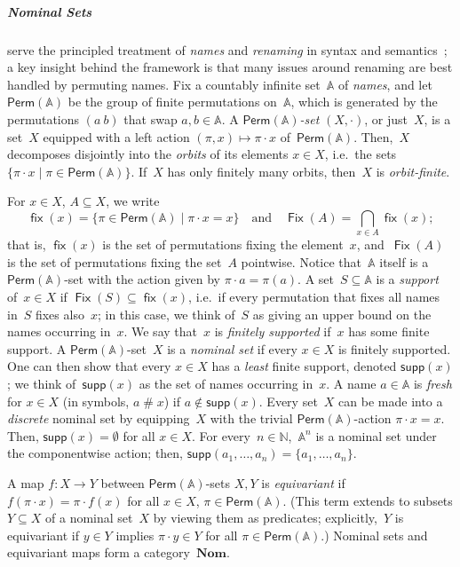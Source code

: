 \documentclass[11pt,a4paper]{amsart}
\newcommand{\Perm}{\mathsf{Perm}(\Names)}
\newcommand{\Names}{\mathbb{A}}
\newcommand{\fresh}{\mathbin{\#}}
\newcommand{\supp}{\mathsf{supp}}
\newcommand{\fix}{\mathop{\mathsf{fix}}}
\newcommand{\Fix}{\mathop{\mathsf{Fix}}}
\theoremstyle{plain}
\numberwithin{equation}{section}
\newcommand{\Nat}{{\mathbb{N}}}
\newcommand{\+}[1]{\mathcal{#1}\xspace}
\newcommand{\Nom}{\mathbf{Nom}}
\theoremstyle{definition}
\begin{document}
\subparagraph*{Nominal Sets} serve the principled treatment of
\emph{names} and \emph{renaming} in syntax and
semantics~\cite{Pitts13}; a key insight behind the framework is that many
issues around renaming are best handled by permuting names. Fix a
countably infinite set~$\Names$ of \emph{names}, and let~$\Perm$ be
the group of finite permutations on~$\Names$, which is generated by the permutations $(a\ b)$ that
swap $a,b\in\Names$. A \emph{$\Perm$-set} $(X,{\cdot})$, or just~$X$,
is a set~$X$ equipped with a left action $(\pi,x)\mapsto \pi\cdot x$
of~$\Perm$. Then,~$X$ decomposes disjointly into the \emph{orbits} of
its elements $x\in X$, i.e.~the sets $\{\pi\cdot x\mid\pi\in
\Perm\}$. If~$X$ has only finitely many orbits, then~$X$ is
\emph{orbit-finite}.

For $x\in X$, $A\subseteq X$,
we write
\begin{equation*}\textstyle
  \fix(x)=\{\pi\in \Perm\mid \pi\cdot x=x\}\quad\text{and}\quad
  \Fix(A)=\bigcap_{x\in A}\fix(x);
\end{equation*}
that is, $\fix(x)$ is the set of permutations fixing the element~$x$,
and~$\Fix(A)$ is the set of permutations fixing the set~$A$ pointwise.
Notice that~$\Names$ itself is a $\Perm$-set with the action given by
$\pi\cdot a=\pi(a)$. A set~$S\subseteq\Names$ is a \emph{support}
of~$x\in X$ if $\Fix(S)\subseteq\fix(x)$, i.e.~if every permutation
that fixes all names in~$S$ fixes also~$x$; in this case, we think
of~$S$ as giving an upper bound on the names occurring in~$x$. We say
that~$x$ is \emph{finitely supported} if~$x$ has some finite support.
A $\Perm$-set~$X$ is a \emph{nominal set} if every $x\in X$ is
finitely supported. One can then show that every $x\in X$ has a
\emph{least} finite support, denoted $\supp(x)$; we think
of~$\supp(x)$ as the set of names occurring in~$x$. A name
$a\in\Names$ is \emph{fresh} for $x\in X$ (in symbols, $a\fresh x$) if
$a\notin\supp(x)$. Every set~$X$ can be made into a \emph{discrete}
nominal set by equipping~$X$ with the trivial $\Perm$-action
$\pi\cdot x=x$. Then, $\supp(x)=\emptyset$ for all $x\in X$. For
every~$n\in\Nat$,~$\Names^n$ is a nominal set under the componentwise
action; then, $\supp(a_1,\dots,a_n)=\{a_1,\dots,a_n\}$.

A map $f\colon X\to Y$ between $\Perm$-sets $X,Y$ is
\emph{equivariant} if $f(\pi\cdot x)=\pi\cdot f(x)$ for all $x\in X$,
$\pi\in \Perm$. (This term extends to subsets $Y\subseteq X$ of a
nominal set~$X$ by viewing them as predicates; explicitly,~$Y$ is
equivariant if $y\in Y$ implies $\pi\cdot y\in Y$ for all
$\pi\in \Perm$.) Nominal sets and equivariant maps form a
category~$\Nom$.
\end{document}
